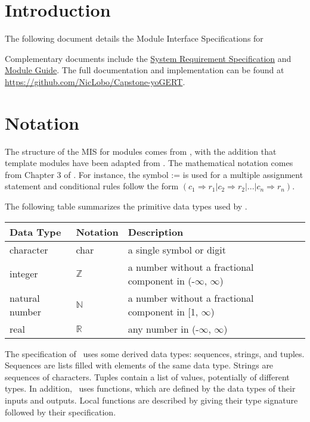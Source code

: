 \documentclass[12pt, titlepage]{article}
\begin{document}

\section{Introduction}

The following document details the Module Interface Specifications for

Complementary documents include the \href{https://github.com/NicLobo/Capstone-yoGERT/blob/main/docs/SRS/SRS.pdf}{System Requirement Specification}
and \href{https://github.com/NicLobo/Capstone-yoGERT/blob/main/docs/Design/SoftArchitecture/MG.pdf}{Module Guide}. The full documentation and implementation can be
found at \url{https://github.com/NicLobo/Capstone-yoGERT}.  %

\section{Notation}
The structure of the MIS for modules comes from \citet{HoffmanAndStrooper1995},
with the addition that template modules have been adapted from
\cite{GhezziEtAl2003}.  The mathematical notation comes from Chapter 3 of
\citet{HoffmanAndStrooper1995}.  For instance, the symbol := is used for a
multiple assignment statement and conditional rules follow the form $(c_1
\Rightarrow r_1 | c_2 \Rightarrow r_2 | ... | c_n \Rightarrow r_n )$.

The following table summarizes the primitive data types used by \progname. 

\begin{center}
\renewcommand{\arraystretch}{1.2}
\noindent 
\begin{tabular}{l l p{7.5cm}} 
\toprule 
\textbf{Data Type} & \textbf{Notation} & \textbf{Description}\\ 
\midrule
character & char & a single symbol or digit\\
integer & $\mathbb{Z}$ & a number without a fractional component in (-$\infty$, $\infty$) \\
natural number & $\mathbb{N}$ & a number without a fractional component in [1, $\infty$) \\
real & $\mathbb{R}$ & any number in (-$\infty$, $\infty$)\\
\bottomrule
\end{tabular} 
\end{center}

\noindent
The specification of \progname \ uses some derived data types: sequences, strings, and
tuples. Sequences are lists filled with elements of the same data type. Strings
are sequences of characters. Tuples contain a list of values, potentially of
different types. In addition, \progname \ uses functions, which
are defined by the data types of their inputs and outputs. Local functions are
described by giving their type signature followed by their specification.
\end{document}
